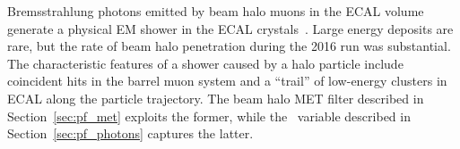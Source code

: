 

Bremsstrahlung photons emitted by beam halo muons in the ECAL volume generate a physical EM shower in the ECAL crystals~\cite{Halo2015}. 
Large energy deposits are rare, but the rate of beam halo penetration during the 2016 run was substantial.
The characteristic features of a shower caused by a halo particle include coincident hits in the barrel muon system and a ``trail'' of low-energy clusters in ECAL along the particle trajectory. 
The beam halo MET filter described in Section~\ref{sec:pf_met} exploits the former, while the \emip\ variable described in Section~\ref{sec:pf_photons} captures the latter.

